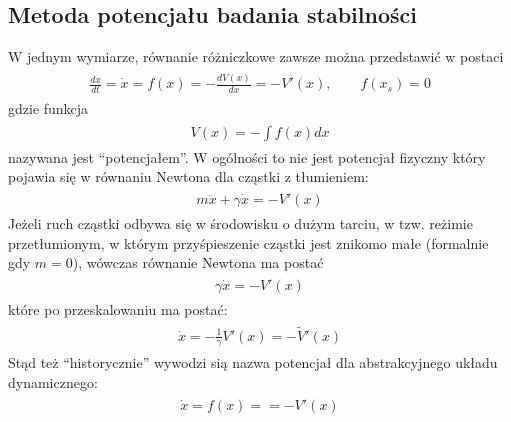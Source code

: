 \documentclass[a4paper,12pt,polish]{sphinxmanual}
\begin{document}
\subsection{Metoda potencjału badania stabilności}
\label{ch1/chI023:metoda-potencjalu-badania-stabilnosci}
W jednym wymiarze, równanie różniczkowe  zawsze można przedstawić w postaci
\label{ch1/chI023:equation-eqn18}\begin{gather}
\begin{split}\frac{dx}{dt} = \dot x = f(x) = -\frac{dV(x)}{dx} = -V'(x), \quad \quad f(x_s) = 0\end{split}\label{ch1/chI023-eqn18}
\end{gather}
gdzie funkcja
\label{ch1/chI023:equation-eqn19}\begin{gather}
\begin{split}V(x) = -\int f(x)  dx\end{split}\label{ch1/chI023-eqn19}
\end{gather}
nazywana jest ``potencjałem''.  W ogólności to nie jest potencjał fizyczny który pojawia się w równaniu Newtona  dla cząstki z tłumieniem:
\label{ch1/chI023:equation-eqn20}\begin{gather}
\begin{split}m \ddot x + \gamma \dot x = -V'(x)\end{split}\label{ch1/chI023-eqn20}
\end{gather}
Jeżeli ruch cząstki odbywa się w środowisku o dużym  tarciu, w tzw. reżimie przetłumionym, w którym przyśpieszenie cząstki jest znikomo małe (formalnie gdy $m=0$), wówczas równanie Newtona ma postać
\label{ch1/chI023:equation-eqn21}\begin{gather}
\begin{split}\gamma \dot x = -V'(x)\end{split}\label{ch1/chI023-eqn21}
\end{gather}
które po przeskalowaniu ma postać:
\label{ch1/chI023:equation-eqn22}\begin{gather}
\begin{split}\dot x = -\frac{1}{\gamma} V'(x) = - {\tilde V} '(x)\end{split}\label{ch1/chI023-eqn22}
\end{gather}
Stąd też ``historycznie'' wywodzi sią nazwa potencjał dla abstrakcyjnego układu dynamicznego:
\label{ch1/chI023:equation-eqn23}\begin{gather}
\begin{split} \dot x = f(x) =  = -V'(x)\end{split}\label{ch1/chI023-eqn23}
\end{gather}
\end{document}
